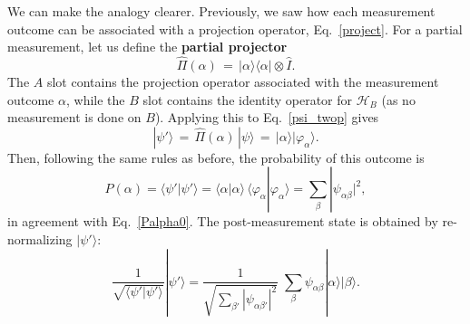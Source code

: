 \documentclass[pra,12pt]{revtex4-2}
\begin{document}
We can make the analogy clearer.  Previously, we saw how each
measurement outcome can be associated with a projection operator,
Eq.~\eqref{project}.  For a partial measurement, let us define the
\textbf{partial projector}
\begin{equation}
  \hat{\Pi}(\alpha) \,=\, |\alpha\rangle\langle \alpha| \otimes  \hat{I}.
\end{equation}
The $A$ slot contains the projection operator associated with the
measurement outcome $\alpha$, while the $B$ slot contains the identity
operator for $\mathscr{H}_B$ (as no measurement is done on $B$).
Applying this to Eq.~\eqref{psi_twop} gives
\begin{equation}
  |\psi'\rangle \,=\, \hat{\Pi}(\alpha)\, |\psi\rangle
  \,=\, |\alpha\rangle |\varphi_\alpha\rangle.
\end{equation}
Then, following the same rules as before, the probability of this
outcome is
\begin{equation}
  P(\alpha) = \langle\psi'|\psi'\rangle
  = \langle \alpha|\alpha\rangle\, \langle \varphi_\alpha|\varphi_\alpha\rangle
  = \sum_\beta |\psi_{\alpha\beta}|^2,
\end{equation}
in agreement with Eq.~\eqref{Palpha0}.  The post-measurement state is
obtained by re-normalizing $|\psi'\rangle$:
\begin{equation}
  \frac{1}{\sqrt{\langle\psi'|\psi'\rangle}} |\psi'\rangle
  =
  \frac{1}{\sqrt{\sum_{\beta'} |\psi_{\alpha\beta'}|^2}}\;
  \sum_{\beta} \psi_{\alpha\beta} |\alpha\rangle |\beta\rangle.
\end{equation}
\end{document}
